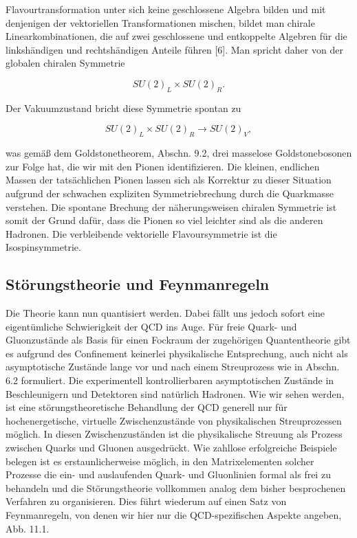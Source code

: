 \documentclass[10pt, letterpaper]{article}
\begin{document}
Flavourtransformation unter sich keine geschlossene Algebra bilden und mit denjenigen der vektoriellen Transformationen mischen, bildet man chirale Linearkombinationen, die auf zwei geschlossene und entkoppelte Algebren für die linkshändigen und rechtshändigen Anteile führen [6]. Man spricht daher von der globalen chiralen Symmetrie

$$
S U(2)_{L} \times S U(2)_{R} .
$$

Der Vakuumzustand bricht diese Symmetrie spontan zu

$$
S U(2)_{L} \times S U(2)_{R} \rightarrow S U(2)_{V},
$$

was gemäß dem Goldstonetheorem, Abschn. 9.2, drei masselose Goldstonebosonen zur Folge hat, die wir mit den Pionen identifizieren. Die kleinen, endlichen Massen der tatsächlichen Pionen lassen sich als Korrektur zu dieser Situation aufgrund der schwachen expliziten Symmetriebrechung durch die Quarkmasse verstehen. Die spontane Brechung der näherungsweisen chiralen Symmetrie ist somit der Grund dafür, dass die Pionen so viel leichter sind als die anderen Hadronen. Die verbleibende vektorielle Flavoursymmetrie ist die Isospinsymmetrie.

\subsection*{Störungstheorie und Feynmanregeln}
Die Theorie kann nun quantisiert werden. Dabei fällt uns jedoch sofort eine eigentümliche Schwierigkeit der QCD ins Auge. Für freie Quark- und Gluonzustände als Basis für einen Fockraum der zugehörigen Quantentheorie gibt es aufgrund des Confinement keinerlei physikalische Entsprechung, auch nicht als asymptotische Zustände lange vor und nach einem Streuprozess wie in Abschn. 6.2 formuliert. Die experimentell kontrollierbaren asymptotischen Zustände in Beschleunigern und Detektoren sind natürlich Hadronen. Wie wir sehen werden, ist eine störungstheoretische Behandlung der QCD generell nur für hochenergetische, virtuelle Zwischenzustände von physikalischen Streuprozessen möglich. In diesen Zwischenzuständen ist die physikalische Streuung als Prozess zwischen Quarks und Gluonen ausgedrückt. Wie zahllose erfolgreiche Beispiele belegen ist es erstaunlicherweise möglich, in den Matrixelementen solcher Prozesse die ein- und auslaufenden Quark- und Gluonlinien formal als frei zu behandeln und die Störungstheorie vollkommen analog dem bisher besprochenen Verfahren zu organisieren. Dies führt wiederum auf einen Satz von Feynmanregeln, von denen wir hier nur die QCD-spezifischen Aspekte angeben, Abb. 11.1.
\end{document}
